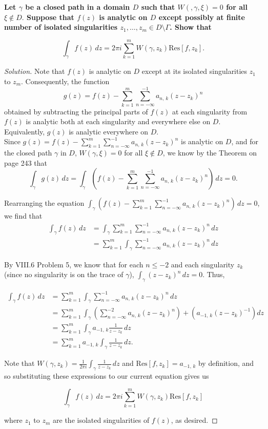 \documentclass[11pt]{article}
\newenvironment{solution}
  {\renewcommand\qedsymbol{$\blacksquare$}\begin{proof}[Solution]}
  {\end{proof}}
\theoremstyle{definition}
\begin{document}
\textbf{Let $\gamma$ be a closed path in a domain $D$ such that $W(, \gamma, \xi) = 0$ for all $\xi \notin D.$ 
Suppose that $f(z)$ is analytic on $D$ except possibly at finite number of isolated singularities $z_1, \dots, z_m \in D \setminus \Gamma$. Show that}

\[ \int_{\gamma} f(z) \, dz = 2\pi i \sum\limits_{k=1}^m W(\gamma, z_k) \mathrm{Res}[f, z_k]. \]

\begin{solution}
Note that $f(z)$ is analytic on $D$ except at its isolated singularities $z_1$ to $z_m$. Consequently, the function \[g(z) = f(z) - \sum\limits_{k=1}^m \sum\limits_{n=-\infty}^{-1} a_{n, \, k}(z-z_k)^n\] obtained by subtracting the principal parts of $f(z)$ at each singularity from $f(z)$ is analytic both at each singularity and everywhere else on $D$. Equivalently, $g(z)$ is analytic everywhere on $D$. \\

Since $g(z) = f(z) - \sum\limits_{k=1}^m \sum\limits_{n=-\infty}^{-1} a_{n, \, k}(z-z_k)^n$ is analytic on $D$, and for the closed path $\gamma$ in $D$, $W(\gamma, \xi) = 0$ for all $\xi \notin D$, we know by the Theorem on page 243 that
\[ \int_\gamma g(z) \, dz = \int_\gamma \left(f(z) - \sum\limits_{k=1}^m \sum\limits_{n=-\infty}^{-1} a_{n, \, k}(z-z_k)^n\right) \, dz = 0.\]

Rearranging the equation $\int_\gamma \left(f(z) - \sum\limits_{k=1}^m \sum\limits_{n=-\infty}^{-1} a_{n, \, k}(z-z_k)^n\right) \, dz = 0$, we find that
\begin{align*} \int_\gamma f(z) \, dz &= \int_\gamma \sum\limits_{k=1}^m \sum\limits_{n=-\infty}^{-1} a_{n, \, k}(z-z_k)^n \, dz \\
&= \sum\limits_{k=1}^m \int_\gamma \sum\limits_{n=-\infty}^{-1} a_{n, \, k}(z-z_k)^n \, dz\end{align*}

By VIII.6 Problem 5, we know that for each $n \leq -2$ and each singularity $z_k$ (since no singularity is on the trace of $\gamma$), $\int_\gamma (z-z_k)^n \, dz = 0$. Thus,  

\begin{align*} \int_\gamma f(z) \, dz
&= \sum\limits_{k=1}^m \int_\gamma \sum\limits_{n=-\infty}^{-1} a_{n, \, k}(z-z_k)^n \, dz \\
&= \sum\limits_{k=1}^m \int_\gamma \left(\sum\limits_{n=-\infty}^{-2} a_{n, \, k}(z-z_k)^n\right) + \left(a_{-1, \, k}(z-z_k)^{-1}\right) dz \\
&= \sum\limits_{k=1}^m \int_\gamma a_{-1, \, k} \frac{1}{z-z_k}\, dz \\
&= \sum\limits_{k=1}^m a_{-1, \, k} \int_\gamma \frac{1}{z-z_k}\, dz.\end{align*}

Note that $W(\gamma, z_k) = \frac{1}{2\pi i} \int_\gamma \frac{1}{z-z_k}\, dz$ and $\mathrm{Res}[f, z_k] = a_{-1, \, k}$ by definition, and so substituting these expressions to our current equation gives us

\[\int_\gamma f(z) \, dz = 2\pi i \sum_{k=1}^m W(\gamma, z_k)\mathrm{Res}[f, z_k] \]

where $z_1$ to $z_m$ are the isolated singularities of $f(z)$, as desired.\end{solution}
\end{document}
